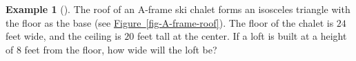 \documentclass[10pt,]{book}
\theoremstyle{plain}
\theoremstyle{definition}
\theoremstyle{definition}
\newtheorem{example}[theorem]{Example}
\theoremstyle{definition}
\numberwithin{equation}{part}
\newlength{\panelmax}
\begin{document}
\begin{example}[]\label{example-83}
The roof of an A-frame ski chalet forms an isosceles triangle with the floor as the base (see \hyperref[fig-A-frame-roof]{Figure~\ref{fig-A-frame-roof}}). The floor of the chalet is \(24\) feet wide, and the ceiling is \(20\) feet tall at the center. If a loft is built at a height of \(8\) feet from the floor, how wide will the loft be?%
{%
\setlength{\panelmax}{0pt}
\newsavebox{\panelboxAXimage}
\newlength{\phAXimage}\setlength{\phAXimage}{\ht\panelboxAXimage+\dp\panelboxAXimage}
\settototalheight{\phAXimage}{\usebox{\panelboxAXimage}}
\setlength{\panelmax}{\maxof{\panelmax}{\phAXimage}}
\newsavebox{\panelboxAYimage}
\newlength{\phAYimage}\setlength{\phAYimage}{\ht\panelboxAYimage+\dp\panelboxAYimage}
\settototalheight{\phAYimage}{\usebox{\panelboxAYimage}}
\setlength{\panelmax}{\maxof{\panelmax}{\phAYimage}}
\leavevmode%
}
\end{example}
\end{document}
